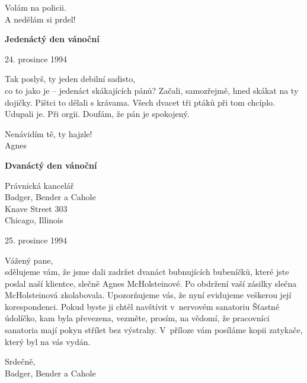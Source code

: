 \medskip

\noindent
Volám na policii. \\
A nedělám si prdel!

\newpage

\noindent
\textbf{Jedenáctý den vánoční}

\begin{flushright}
24. prosince 1994 
\end{flushright}

\noindent
Tak poslyš, ty jeden debilní sadisto, \\
co to jako je – jedenáct skákajících pánů? Začali, samozřejmě, hned skákat na ty dojičky. Pištci to dělali s krávama. Všech dvacet tři ptáků při tom chcíplo. Udupali je. Při orgii. Doufám, že pán je spokojený. 

\medskip

\noindent
Nenávidím tě, ty hajzle! \\
Agnes

\bigskip

\noindent
\textbf{Dvanáctý den vánoční}

\begin{flushright}
Právnická kancelář \\
Badger, Bender a Cahole \\
Knave Street 303 \\
Chicago, Illinois 

\smallskip

25. prosince 1994
\end{flushright}

\noindent
Vážený pane, \\
sdělujeme vám, že jsme dali zadržet dvanáct bubnujících bubeníčků, které jste poslal naší klientce, slečně Agnes McHolsteinové. Po obdržení vaší zásilky slečna McHolsteinová zkolabovala. Upozorňujeme vás, že nyní evidujeme veškerou její korespondenci. Pokud byste ji chtěl navštívit v nervovém sanatoriu Šťastné údolíčko, kam byla převezena, vezměte, prosím, na vědomí, že pracovníci sanatoria mají pokyn střílet bez výstrahy. V příloze vám posíláme kopii zatykače, který byl na vás vydán. 

\medskip

\noindent
Srdečně,\\ 
Badger, Bender a Cahole  

